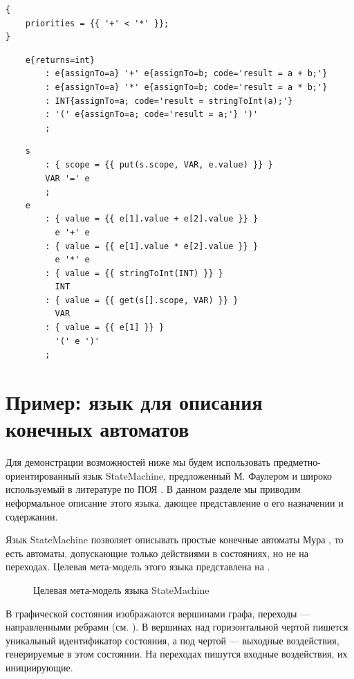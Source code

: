 \begin{lstlisting}
{
	priorities = {{ '+' < '*' }};
}
\end{lstlisting}

\begin{lstlisting}
	e{returns=int} 
		: e{assignTo=a} '+' e{assignTo=b; code='result = a + b;'}
		: e{assignTo=a} '*' e{assignTo=b; code='result = a * b;'}
		: INT{assignTo=a; code='result = stringToInt(a);'}
		: '(' e{assignTo=a; code='result = a;'} ')'
		;
\end{lstlisting}

\begin{lstlisting}
	s
		: { scope = {{ put(s.scope, VAR, e.value) }} }
		VAR '=' e
		;
	e
		: { value = {{ e[1].value + e[2].value }} }
		  e '+' e
		: { value = {{ e[1].value * e[2].value }} }
		  e '*' e
		: { value = {{ stringToInt(INT) }} }
		  INT
		: { value = {{ get(s[].scope, VAR) }} }
		  VAR
		: { value = {{ e[1] }} }
		  '(' e ')'
		;
\end{lstlisting}

\section{Пример: язык для описания конечных автоматов}

Для демонстрации возможностей  ниже мы будем использовать предметно-ориентированный язык StateMachine, предложенный М. Фаулером \cite{???} и широко используемый в литературе по ПОЯ \cite{???}. В данном разделе мы приводим неформальное описание этого языка, дающее представление о его назначении и содержании.

Язык StateMachine позволяет описывать простые конечные автоматы Мура \cite{???}, то есть автоматы, допускающие только действиями в состояниях, но не на переходах. Целевая мета-модель этого языка представлена на .

\begin{figure}[htbp]
	\caption{Целевая мета-модель языка StateMachine}\label{SMMM}
\end{figure}

В графической состояния изображаются вершинами графа, переходы --- направленными ребрами (см. ). В вершинах над горизонтальной чертой пишется уникальный идентификатор состояния, а под чертой --- выходные воздействия, генерируемые в этом состоянии. На переходах пишутся входные воздействия, их инициирующие.

